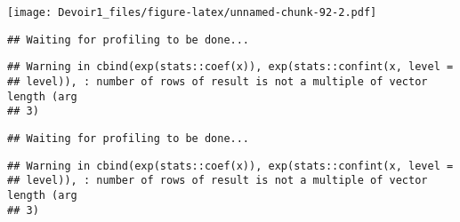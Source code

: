 \documentclass[]{article}
\newenvironment{Shaded}{\begin{snugshade}}{\end{snugshade}}
\newcommand{\KeywordTok}[1]{\textcolor[rgb]{0.13,0.29,0.53}{\textbf{#1}}}
\newcommand{\DataTypeTok}[1]{\textcolor[rgb]{0.13,0.29,0.53}{#1}}
\newcommand{\DecValTok}[1]{\textcolor[rgb]{0.00,0.00,0.81}{#1}}
\newcommand{\StringTok}[1]{\textcolor[rgb]{0.31,0.60,0.02}{#1}}
\newcommand{\OperatorTok}[1]{\textcolor[rgb]{0.81,0.36,0.00}{\textbf{#1}}}
\newcommand{\NormalTok}[1]{#1}
\begin{document}
\texttt{[image: Devoir1\_files/figure-latex/unnamed-chunk-92-2.pdf]}

\begin{Shaded}
\end{Shaded}

\begin{verbatim}
## Waiting for profiling to be done...
\end{verbatim}

\begin{verbatim}
## Warning in cbind(exp(stats::coef(x)), exp(stats::confint(x, level =
## level)), : number of rows of result is not a multiple of vector length (arg
## 3)
\end{verbatim}

\begin{verbatim}
## Waiting for profiling to be done...
\end{verbatim}

\begin{verbatim}
## Warning in cbind(exp(stats::coef(x)), exp(stats::confint(x, level =
## level)), : number of rows of result is not a multiple of vector length (arg
## 3)
\end{verbatim}
\end{document}
